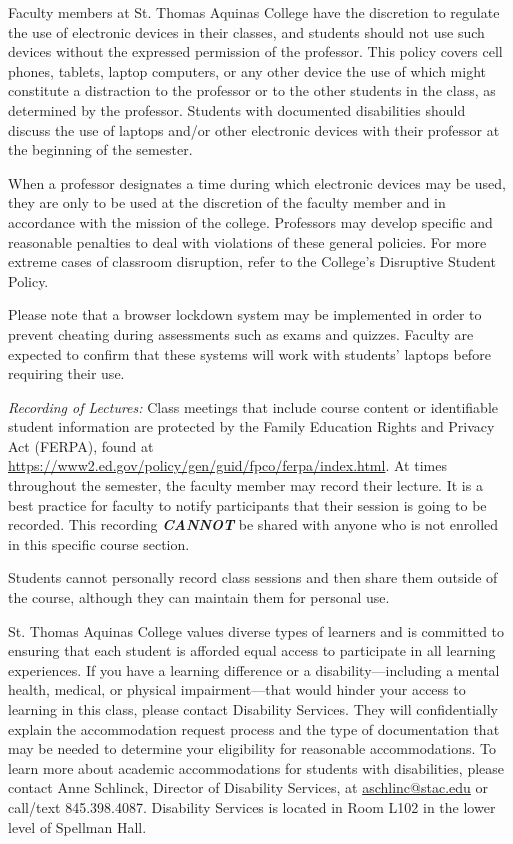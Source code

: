 \documentclass[11pt,letterpaper]{article}
\begin{document}
Faculty members at St. Thomas Aquinas College have the discretion to regulate the use of electronic devices in their classes, and students should not use such devices without the expressed permission of the professor. This policy covers cell phones, tablets, laptop computers, or any other device the use of which might constitute a distraction to the professor or to the other students in the class, as determined by the professor. Students with documented disabilities should discuss the use of laptops and/or other electronic devices with their professor at the beginning of the semester. \pspace

When a professor designates a time during which electronic devices may be used, they are only to be used at the discretion of the faculty member and in accordance with the mission of the college. Professors may develop specific and reasonable penalties to deal with violations of these general policies. For more extreme cases of classroom disruption, refer to the College's Disruptive Student Policy. \pspace

Please note that a browser lockdown system may be implemented in order to prevent cheating during assessments such as exams and quizzes. Faculty are expected to confirm that these systems will work with students' laptops before requiring their use. \pspace

{\itshape Recording of Lectures:} Class meetings that include course content or identifiable student information are protected by the Family Education Rights and Privacy Act (FERPA), found at \url{https://www2.ed.gov/policy/gen/guid/fpco/ferpa/index.html}. At times throughout the semester, the faculty member may record their lecture. It is a best practice for faculty to notify participants that their session is going to be recorded. This recording \textit{\textbf{CANNOT}} be shared with anyone who is not enrolled in this specific course section. \pspace

Students cannot personally record class sessions and then share them outside of the course, although they can maintain them for personal use. \pspace




St. Thomas Aquinas College values diverse types of learners and is committed to ensuring that each student is afforded equal access to participate in all learning experiences. If you have a learning difference or a disability---including a mental health, medical, or physical impairment---that would hinder your access to learning in this class, please contact Disability Services. They will confidentially explain the accommodation request process and the type of documentation that may be needed to determine your eligibility for reasonable accommodations. To learn more about academic accommodations for students with disabilities, please contact Anne Schlinck, Director of Disability Services, at \href{mailto:aschlinc@stac.edu}{aschlinc@stac.edu} or call/text 845.398.4087. Disability Services is located in Room L102 in the lower level of Spellman Hall. \pspace
\end{document}
